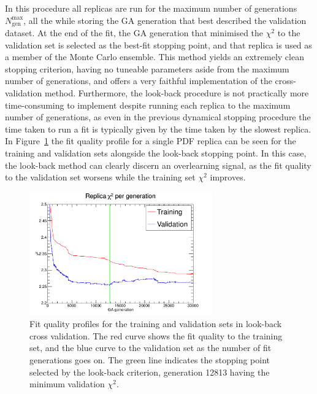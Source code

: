 In this procedure all replicas are run for the maximum number of generations $N_{\text{gen}}^{\text{max}}$, all the while storing the GA generation that best described the validation dataset. At the end of the fit, the GA generation that minimised the $\chi^2$ to the validation set is selected as the best-fit stopping point, and that replica is used as a member of the Monte Carlo ensemble. This method yields an extremely clean stopping criterion, having no tuneable parameters aside from the maximum number of generations, and offers a very faithful implementation of the cross-validation method. Furthermore, the look-back procedure is not practically more time-consuming to implement despite running each replica to the maximum number of generations, as even in the previous dynamical stopping procedure the time taken to run a fit is typically given by the time taken by the slowest replica. In Figure~\ref{fig:LBCVchi2prof} the fit quality profile for a single PDF replica can be seen for the training and validation sets alongside the look-back stopping point. In this case, the look-back method can clearly discern an overlearning signal, as the fit quality to the validation set worsens while the training set $\chi^2$ improves.

\begin{figure}[!]
\centering
\includegraphics[width=0.7\textwidth]{7-PostLHC/figs/lookbackchi2prof.pdf}
\caption[Fit quality profiles for the training and validation sets in look-back cross validation]{Fit quality profiles for the training and validation sets in look-back cross validation. The red curve shows the fit quality to the training set, and the blue curve to the validation set as the number of fit generations goes on. The green line indicates the stopping point selected by the look-back criterion, generation 12813 having the minimum validation $\chi^2$.}
\label{fig:LBCVchi2prof}
\end{figure}


